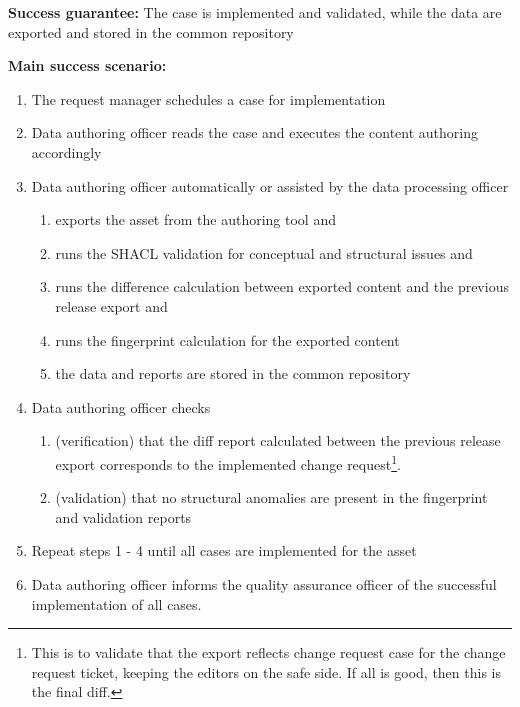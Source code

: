 	\textbf{Success guarantee:} The case is implemented and validated, while the data are exported and stored in the common repository
	
	\textbf{Main success scenario:}
	
	\begin{enumerate}
		\item The request manager schedules a case for implementation
		\item Data authoring officer reads the case and executes the content authoring accordingly
		\item Data authoring officer automatically or assisted by the data processing officer
		\begin{enumerate}
			\item exports the asset from the authoring tool and 
			\item runs the SHACL validation for conceptual and structural issues and
			\item runs the difference calculation between exported content and the previous release export and
			\item runs the fingerprint calculation for the exported content
			\item the data and reports are stored in the common repository 
		\end{enumerate}		
		\item Data authoring officer checks 
		\begin{enumerate}
			\item (verification) that the diff report calculated between the previous release export corresponds to the implemented change request\footnote{This is to validate that the export reflects change request case for the change request ticket, keeping the editors on the safe side. If all is good, then this is the final diff.}.
			\item (validation) that no structural anomalies are present in the fingerprint and validation reports
		\end{enumerate}		 
		\item Repeat steps 1 - 4 until all cases are implemented for the asset
		\item Data authoring officer informs the quality assurance officer of the successful implementation of all cases.		
	\end{enumerate}
	
